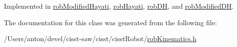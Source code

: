 Implemented in \hyperlink{classrob_modified_hayati_a3e487aaa0708be391310862b0579d282}{rob\+Modified\+Hayati}, \hyperlink{classrob_hayati_afe4cc7030ab2d8a249269afc4b7822c9}{rob\+Hayati}, \hyperlink{classrob_d_h_abb1b7454fcbe0b2ac14de4fd9d5a842f}{rob\+D\+H}, and \hyperlink{classrob_modified_d_h_a915ba9c48ba16f44b0745e5be810a993}{rob\+Modified\+D\+H}.



The documentation for this class was generated from the following file\+:\begin{DoxyCompactItemize}
\item 
/\+Users/anton/devel/cisst-\/saw/cisst/cisst\+Robot/\hyperlink{rob_kinematics_8h}{rob\+Kinematics.\+h}\end{DoxyCompactItemize}

